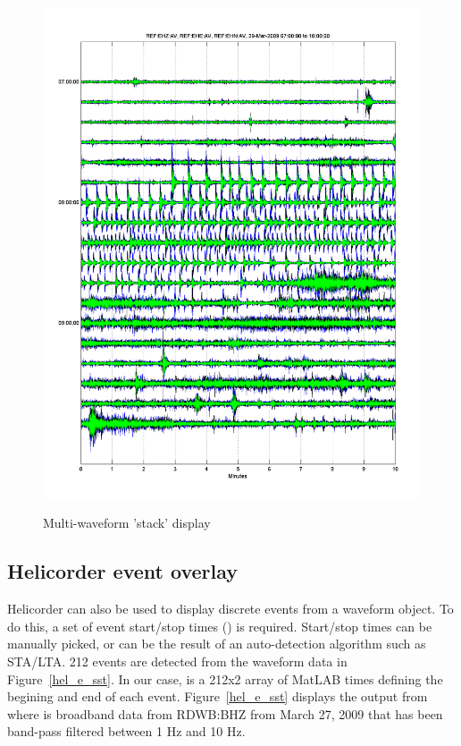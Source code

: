 \documentclass[11pt]{article}
\begin{document}
\begin{figure}[ht] 
\centerline{\scalebox{.6} {\includegraphics{hel_stack_1.png}}} 
\caption{Multi-waveform 'stack' display} 
\label{hel_stack_1}
\end{figure}

\clearpage

\subsection{Helicorder event overlay}

Helicorder can also be used to display discrete events from a waveform object. To do this, a set of event start/stop times () is required. Start/stop times can be manually picked, or can be the result of an auto-detection algorithm such as STA/LTA. 212 events are detected from the waveform data in Figure~\ref{hel_e_sst}. In our case,  is a 212x2 array of MatLAB times defining the begining and end of each event. Figure~\ref{hel_e_sst} displays the output from  where  is broadband data from RDWB:BHZ from March 27, 2009 that has been band-pass filtered between 1 Hz and 10 Hz.
\end{document}
